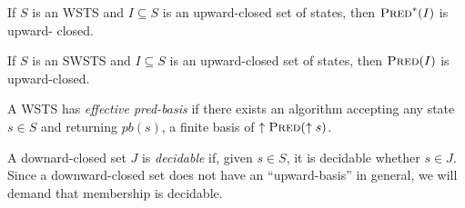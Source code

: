\begin{proposition}
If $S$ is an WSTS and $I \subseteq S$ is an upward-closed set of states, then $\textsc{Pred}^*(I )$ is upward-
closed.
\end{proposition}

\iffalse
Proof. Assume $s \in \pred^* (I )$. Then $s \rightarrow^* t$ for some $t \in I $. If now $s' \geq s$ then upward-compatibility entails that $s' \rightarrow^* t'$ for some $t' \geq t$. Then $t' \in I$ and $s' \in \pred^*(I )$.
\fi

\begin{proposition}
If $S$ is an SWSTS and $I \subseteq S$ is an upward-closed set of states, then $\textsc{Pred}(I )$ is upward-closed.
\end{proposition}
\iffalse
Proof. Assume $s \in \pred (I )$. Then $s \rightarrow t$ for some $t \in I $. If now $s' \geq s$ then strong upward-compatibility entails that $s' \rightarrow t'$ for some $t' \geq t$. Then $t' \in I$ and $s' \in \pred(I )$.
\fi




\begin{definition}
A WSTS has {\em effective pred-basis} if there exists an algorithm accepting
any state $s \in S$ and returning $pb(s)$, a finite basis of $\uparrow \textsc{Pred}(\uparrow s)$.
\end{definition}



\iffalse
\begin{definition}
A {\em bi-ideal} $I \subseteq S$ is an upward-closed and downward-closed set, i.e
$\uparrow I = I = \downarrow I$.
\end{definition}

"Bi-ideals often represent “control states” as in [cf \%]. "

\fi

A downard-closed set $J$ is {\em decidable} if, given $s \in S$, it is decidable whether
$s \in J$. 
Since a downward-closed set does not have an ``upward-basis'' in general, we will demand that membership is decidable.

